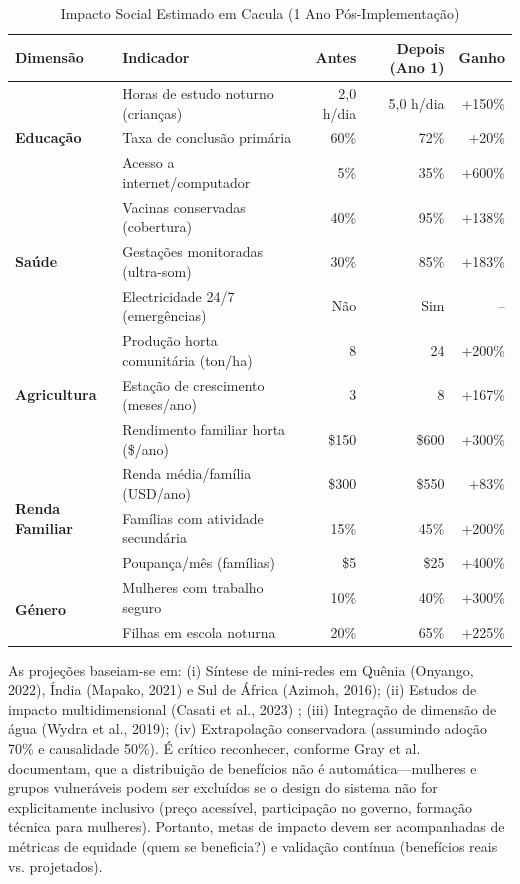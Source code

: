 \documentclass[12pt, a4paper]{article}
\begin{document}
{{{{{{{{{{{{\begin{table}[H]
\centering
\caption{Impacto Social Estimado em Cacula (1 Ano Pós-Implementação)}
\label{tab:cacula_impact}
\small
\begin{tabular}{|l|l|r|r|r|}
\hline
\textbf{Dimensão} & \textbf{Indicador} & \textbf{Antes} & \textbf{Depois (Ano 1)} & \textbf{Ganho} \\
\hline
\multirow{3}{*}{\textbf{Educação}} 
  & Horas de estudo noturno (crianças) & 2,0 h/dia & 5,0 h/dia & +150\% \\
  & Taxa de conclusão primária & 60\% & 72\% & +20\% \\
  & Acesso a internet/computador & 5\% & 35\% & +600\% \\
\hline
\multirow{3}{*}{\textbf{Saúde}}
  & Vacinas conservadas (cobertura) & 40\% & 95\% & +138\% \\
  & Gestações monitoradas (ultra-som) & 30\% & 85\% & +183\% \\
  & Electricidade 24/7 (emergências) & Não & Sim & -- \\
\hline
\multirow{3}{*}{\textbf{Agricultura}}
  & Produção horta comunitária (ton/ha) & 8 & 24 & +200\% \\
  & Estação de crescimento (meses/ano) & 3 & 8 & +167\% \\
  & Rendimento familiar horta (\$/ano) & \$150 & \$600 & +300\% \\
\hline
\multirow{3}{*}{\textbf{Renda Familiar}}
  & Renda média/família (USD/ano) & \$300 & \$550 & +83\% \\
  & Famílias com atividade secundária & 15\% & 45\% & +200\% \\
  & Poupança/mês (famílias) & \$5 & \$25 & +400\% \\
\hline
\multirow{2}{*}{\textbf{Género}}
  & Mulheres com trabalho seguro & 10\% & 40\% & +300\% \\
  & Filhas em escola noturna & 20\% & 65\% & +225\% \\
\hline
\end{tabular}
\end{table}

As projeções baseiam-se em: (i) Síntese de mini-redes em Quênia (Onyango, 2022), Índia (Mapako, 2021) e Sul de África (Azimoh, 2016); (ii) Estudos de impacto multidimensional (Casati et al., 2023) ; (iii) Integração de dimensão de água (Wydra et al., 2019); (iv) Extrapolação conservadora (assumindo adoção 70\% e causalidade 50\%).  É crítico reconhecer, conforme Gray et al.~\citep{Gray2019} documentam, que a distribuição de benefícios não é automática—mulheres e grupos vulneráveis podem ser excluídos se o design do sistema não for explicitamente inclusivo (preço acessível, participação no governo, formação técnica para mulheres). Portanto, metas de impacto devem ser acompanhadas de métricas de equidade (quem se beneficia?) e validação contínua (benefícios reais vs. projetados).

}}}}}}}}}}}}
\end{document}
